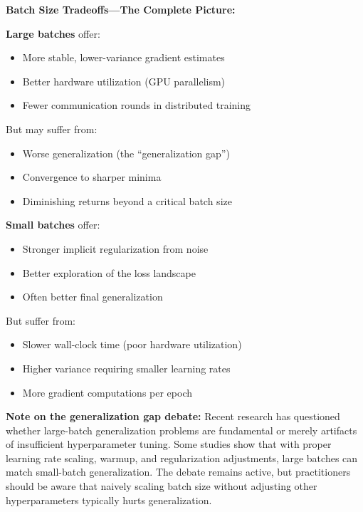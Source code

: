 \documentclass[../../main.tex]{subfiles}
\begin{document}
\begin{keyconcept}
\textbf{Batch Size Tradeoffs---The Complete Picture:}

\textbf{Large batches} offer:
\begin{itemize}
    \item More stable, lower-variance gradient estimates
    \item Better hardware utilization (GPU parallelism)
    \item Fewer communication rounds in distributed training
\end{itemize}
But may suffer from:
\begin{itemize}
    \item Worse generalization (the ``generalization gap'')
    \item Convergence to sharper minima
    \item Diminishing returns beyond a critical batch size
\end{itemize}

\textbf{Small batches} offer:
\begin{itemize}
    \item Stronger implicit regularization from noise
    \item Better exploration of the loss landscape
    \item Often better final generalization
\end{itemize}
But suffer from:
\begin{itemize}
    \item Slower wall-clock time (poor hardware utilization)
    \item Higher variance requiring smaller learning rates
    \item More gradient computations per epoch
\end{itemize}

\textbf{Note on the generalization gap debate:} Recent research has questioned whether large-batch generalization problems are fundamental or merely artifacts of insufficient hyperparameter tuning. Some studies show that with proper learning rate scaling, warmup, and regularization adjustments, large batches can match small-batch generalization. The debate remains active, but practitioners should be aware that naively scaling batch size without adjusting other hyperparameters typically hurts generalization.
\end{keyconcept}
\end{document}

